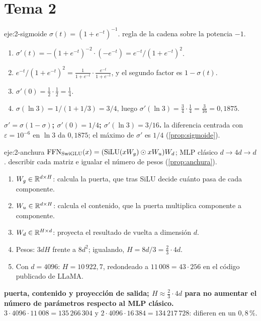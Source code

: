 \section{Tema 2}

\begin{solucion}{eje:2-sigmoide}
\datos $\sigma(t)=(1+e^{-t})^{-1}$.
\planteamiento regla de la cadena sobre la potencia $-1$.
\pasos
\begin{enumerate}[label=\arabic*.]
  \item $\sigma'(t)=-(1+e^{-t})^{-2}\cdot(-e^{-t})=e^{-t}/(1+e^{-t})^{2}$.
  \item $e^{-t}/(1+e^{-t})^{2}=\frac{1}{1+e^{-t}}\cdot\frac{e^{-t}}{1+e^{-t}}$, y el segundo factor es $1-\sigma(t)$.
  \item $\sigma'(0)=\tfrac12\cdot\tfrac12=\tfrac14$.
  \item $\sigma(\ln 3)=1/(1+1/3)=3/4$, luego $\sigma'(\ln 3)=\tfrac34\cdot\tfrac14=\tfrac{3}{16}=0{,}1875$.
\end{enumerate}
\resultado \textbf{$\sigma'=\sigma(1-\sigma)$; $\sigma'(0)=1/4$; $\sigma'(\ln 3)=3/16$.}
\comprobacion la diferencia centrada con $\varepsilon=10^{-6}$ en $\ln 3$ da $0{,}1875$; el máximo de $\sigma'$ es $1/4$ (\cref{prop:sigmoide}).
\end{solucion}

\begin{solucion}{eje:2-anchura}
\datos $\operatorname{FFN}_{\mathrm{SwiGLU}}(x)=(\operatorname{SiLU}(xW_g)\odot xW_u)W_d$; MLP clásico $d\to 4d\to d$.
\planteamiento describir cada matriz e igualar el número de pesos (\cref{prop:anchura}).
\pasos
\begin{enumerate}[label=\arabic*.]
  \item $W_g\in\mathbb{R}^{d\times H}$: calcula la puerta, que tras SiLU decide cuánto pasa de cada componente.
  \item $W_u\in\mathbb{R}^{d\times H}$: calcula el contenido, que la puerta multiplica componente a componente.
  \item $W_d\in\mathbb{R}^{H\times d}$: proyecta el resultado de vuelta a dimensión $d$.
  \item Pesos: $3dH$ frente a $8d^{2}$; igualando, $H=8d/3=\tfrac23\cdot 4d$.
  \item Con $d=4096$: $H=10\,922{,}7$, redondeado a $11\,008=43\cdot 256$ en el código publicado de LLaMA.
\end{enumerate}
\resultado \textbf{puerta, contenido y proyección de salida; $H\approx\tfrac23\cdot 4d$ para no aumentar el número de parámetros respecto al MLP clásico.}
\comprobacion $3\cdot 4096\cdot 11\,008=135\,266\,304$ y $2\cdot 4096\cdot 16\,384=134\,217\,728$: difieren en un $0{,}8\,\%$.
\end{solucion}

